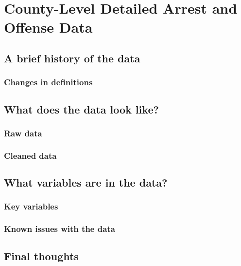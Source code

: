 \documentclass[
  12pt,
  openany]{book}
\begin{document}
\hypertarget{county_level}{%
\chapter{County-Level Detailed Arrest and Offense Data}\label{county_level}}

\hypertarget{a-brief-history-of-the-data-6}{%
\section{A brief history of the data}\label{a-brief-history-of-the-data-6}}

\hypertarget{changes-in-definitions-6}{%
\subsection{Changes in definitions}\label{changes-in-definitions-6}}

\hypertarget{what-does-the-data-look-like-6}{%
\section{What does the data look like?}\label{what-does-the-data-look-like-6}}

\hypertarget{raw-data-6}{%
\subsection{Raw data}\label{raw-data-6}}

\hypertarget{cleaned-data-6}{%
\subsection{Cleaned data}\label{cleaned-data-6}}

\hypertarget{what-variables-are-in-the-data-6}{%
\section{What variables are in the data?}\label{what-variables-are-in-the-data-6}}

\hypertarget{key-variables-6}{%
\subsection{Key variables}\label{key-variables-6}}

\hypertarget{known-issues-with-the-data-6}{%
\subsection{Known issues with the data}\label{known-issues-with-the-data-6}}

\hypertarget{final-thoughts-6}{%
\section{Final thoughts}\label{final-thoughts-6}}

  
\end{document}
